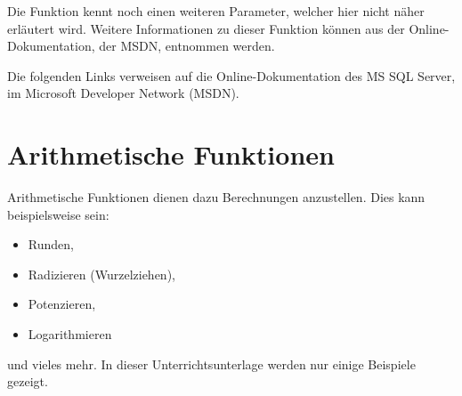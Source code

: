           \begin{merke}
            Die Funktion  kennt noch einen weiteren
            Parameter, welcher hier nicht n\"aher erl\"autert wird. Weitere
            Informationen zu dieser Funktion k\"onnen aus der
            Online-Dokumentation, der MSDN, entnommen werden.
          \end{merke}
          Die folgenden Links verweisen auf die Online-Dokumentation des MS SQL
          Server, im Microsoft Developer Network (MSDN).
          \begin{literaturinternet}
            \item \cite{ms190329}
            \item \cite{ms187748}
            \item \cite{ms186323}
          \end{literaturinternet}
    \section{Arithmetische Funktionen}
      Arithmetische Funktionen dienen dazu Berechnungen anzustellen. Dies kann
      beispielsweise sein:
      \begin{itemize}
        \item Runden,
        \item Radizieren (Wurzelziehen),
        \item Potenzieren,
        \item Logarithmieren
      \end{itemize}
      und vieles mehr. In dieser Unterrichtsunterlage werden nur einige
      Beispiele gezeigt.
